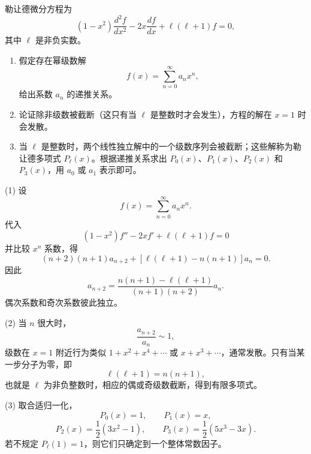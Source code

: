 \begin{question}
勒让德微分方程为
\[
(1-x^2)\frac{d^2f}{dx^2}-2x\frac{df}{dx}+\ell(\ell+1)f=0,
\]
其中 $\ell$ 是非负实数。
\begin{enumerate}
\item 假定存在幂级数解
\[
f(x)=\sum_{n=0}^{\infty}a_nx^n,
\]
给出系数 $a_n$ 的递推关系。
\item 论证除非级数被截断（这只有当 $\ell$ 是整数时才会发生），方程的解在 $x=1$ 时会发散。
\item 当 $\ell$ 是整数时，两个线性独立解中的一个级数序列会被截断；这些解称为勒让德多项式 $P_\ell(x)$。根据递推关系求出 $P_0(x)$、$P_1(x)$、$P_2(x)$ 和 $P_3(x)$，用 $a_0$ 或 $a_1$ 表示即可。
\end{enumerate}
\end{question}
\begin{solution}
(1) 设
\[
f(x)=\sum_{n=0}^{\infty}a_nx^n.
\]
代入
\[
(1-x^2)f''-2xf'+\ell(\ell+1)f=0
\]
并比较 $x^n$ 系数，得
\[
(n+2)(n+1)a_{n+2}+[\ell(\ell+1)-n(n+1)]a_n=0.
\]
因此
\[
a_{n+2}=\frac{n(n+1)-\ell(\ell+1)}{(n+1)(n+2)}a_n.
\]
偶次系数和奇次系数彼此独立。

(2) 当 $n$ 很大时，
\[
\frac{a_{n+2}}{a_n}\sim1,
\]
级数在 $x=1$ 附近行为类似 $1+x^2+x^4+\cdots$ 或 $x+x^3+\cdots$，通常发散。只有当某一步分子为零，即
\[
\ell(\ell+1)=n(n+1),
\]
也就是 $\ell$ 为非负整数时，相应的偶或奇级数截断，得到有限多项式。

(3) 取合适归一化，
\[
P_0(x)=1,
\qquad
P_1(x)=x,
\]
\[
P_2(x)=\frac12(3x^2-1),
\qquad
P_3(x)=\frac12(5x^3-3x).
\]
若不规定 $P_\ell(1)=1$，则它们只确定到一个整体常数因子。
\end{solution}
